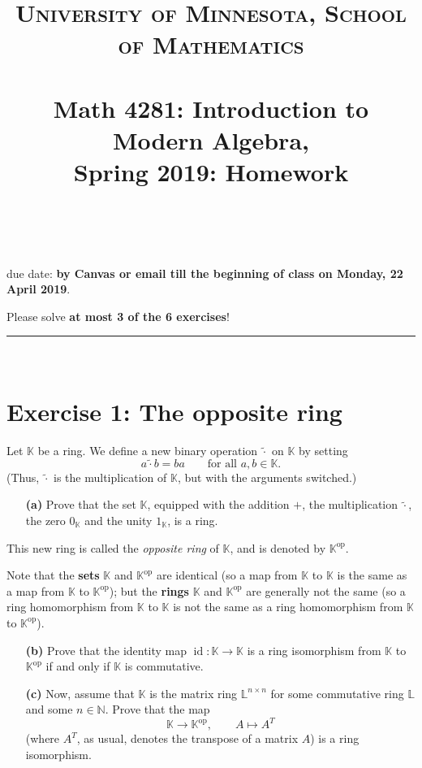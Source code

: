 \documentclass[paper=a4, fontsize=12pt]{scrartcl} %
\title{	
\normalfont \normalsize 
\textsc{University of Minnesota, School of Mathematics} \\ [25pt] %
\horrule{0.5pt} \\[0.4cm] %
\huge Math 4281: Introduction to Modern Algebra, \\
Spring 2019:
Homework \psetnumber\\%
\horrule{2pt} \\[0.5cm] %
}
\author{\myname}
\newcommand{\NN}{\mathbb{N}} %
\newcommand{\KK}{\mathbb{K}} %
\newcommand{\LL}{\mathbb{L}} %
\newcommand{\id}{\operatorname{id}} %
\newcommand{\op}{\operatorname{op}} %
\newcommand{\tildot}{\left. \widetilde{\cdot} \right.}
\newcommand{\horrule}[1]{\rule{\linewidth}{#1}} %
\theoremstyle{plainsl}
\theoremstyle{definition}
\theoremstyle{remark}
\begin{document}
\maketitle %

\begin{center} %
{\large due date: \textbf{by Canvas or email till the beginning of class on Monday, 22 April 2019}.

Please solve \textbf{at most 3 of the 6 exercises}!}
\end{center}

\horrule{0.3pt} \\[0.4cm]

\section{Exercise 1: The opposite ring}

Let $\KK$ be a ring.
We define a new binary operation $\tildot$ on $\KK$ by setting
\[
a \tildot b = ba \qquad \text{for all } a, b \in \KK .
\]
(Thus, $\tildot$ is the multiplication of $\KK$, but with the
arguments switched.)

\begin{enumerate}

\item[\textbf{(a)}] Prove that the set $\KK$, equipped with the
addition $+$, the multiplication $\tildot$, the zero $0_{\KK}$
and the unity $1_{\KK}$, is a ring.

\end{enumerate}

\noindent This new ring is called the \textit{opposite ring} of $\KK$,
and is denoted by $\KK^{\op}$.

Note that the \textbf{sets} $\KK$ and $\KK^{\op}$ are identical
(so a map from $\KK$ to $\KK$ is the same as a map from
$\KK$ to $\KK^{\op}$);
but the \textbf{rings} $\KK$ and $\KK^{\op}$ are generally
not the same
(so a ring homomorphism from $\KK$ to $\KK$ is not the same as a
ring homomorphism from $\KK$ to $\KK^{\op}$).

\begin{enumerate}

\item[\textbf{(b)}] Prove that the identity map
$\id : \KK \to \KK$ is a ring isomorphism from $\KK$ to
$\KK^{\op}$ if and only if $\KK$ is commutative.

\item[\textbf{(c)}] Now, assume that $\KK$ is the matrix ring
$\LL^{n \times n}$ for some commutative ring $\LL$ and some
$n \in \NN$.
Prove that the map
\[
\KK \to \KK^{\op}, \qquad A \mapsto A^T
\]
(where $A^T$, as usual, denotes the transpose of a matrix $A$)
is a ring isomorphism.

\end{enumerate}
\end{document}
